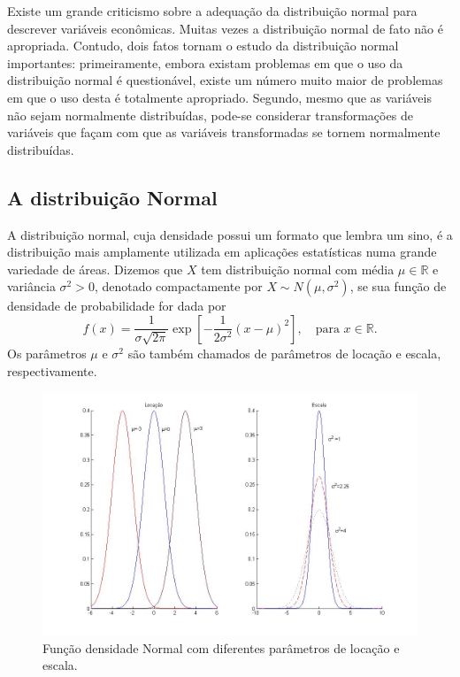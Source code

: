 \documentclass[
]{book}
\theoremstyle{definition}
\theoremstyle{definition}
\theoremstyle{definition}
\theoremstyle{remark}
\begin{document}
Existe um grande criticismo sobre a adequação da distribuição normal para descrever variáveis econômicas. Muitas vezes a distribuição normal de fato não é apropriada. Contudo, dois fatos tornam o estudo da distribuição normal importantes: primeiramente, embora existam problemas em que o uso da distribuição normal é questionável, existe um número muito maior de problemas em que o uso desta é totalmente apropriado. Segundo, mesmo que as variáveis não sejam normalmente distribuídas, pode-se considerar transformações de variáveis que façam com que as variáveis transformadas se tornem normalmente distribuídas.

\hypertarget{a-distribuiuxe7uxe3o-normal}{%
\subsection{A distribuição Normal}\label{a-distribuiuxe7uxe3o-normal}}

A distribuição normal, cuja densidade possui um formato que lembra um sino, é a distribuição
mais amplamente utilizada em aplicações estatísticas numa grande variedade de áreas. Dizemos que \(X\) tem distribuição normal com média \(\mu\in\mathbb{R}\) e variância \(\sigma^2>0\), denotado compactamente por \(X\sim N(\mu,\sigma^2)\), se sua função de densidade de probabilidade for dada por
\[f(x)=\frac{1}{\sigma \sqrt{2\pi}}\exp\left[-\frac{1}{2\sigma^2}(x-\mu)^2\right], \quad \mbox{para } x\in\mathbb{R}.\]
Os parâmetros \(\mu\) e \(\sigma^2\) são também
chamados de parâmetros de locação e escala, respectivamente.

\begin{figure}

{\centering \includegraphics[width=0.8\linewidth]{Figuras/Loc_Esc_Normal} 

}

\caption{Função densidade Normal com diferentes parâmetros de locação  e escala.}\label{fig:LEN}
\end{figure}
\end{document}
